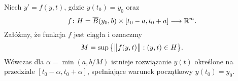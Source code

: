 \begin{theorem}[Peano]
  Niech $y' = f(y,t)$, gdzie $y(t_0) = y_0$ oraz
  \[
    f \colon H = \overline{B} (y_0, b) \times [t_0 - a, t_0 + a] \longrightarrow \R^m.
  \]
  Załóżmy, że funkcja $f$ jest ciągła i oznaczmy
  \[
    M = \sup \big\{ \norm[\big]{f(y,t)} : (y, t) \in H \big\}.
  \]
  Wówczas dla $\alpha = \min(a, b/M)$ istnieje rozwiązanie $y(t)$ określone na
  przedziale $[t_0 - \alpha, t_0 + \alpha]$, spełniające warunek początkowy $y(t_0) = y_0$.
\end{theorem}